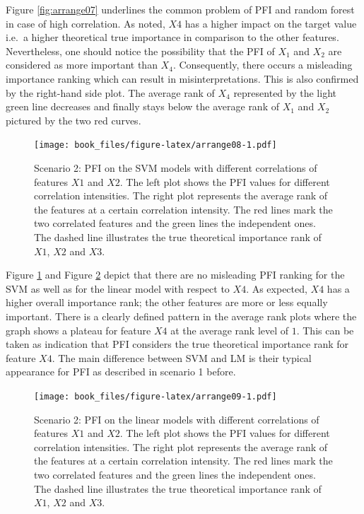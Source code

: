 \documentclass[
]{krantz}
\begin{document}
Figure \ref{fig:arrange07} underlines the common problem of PFI and random forest in case of high correlation. As noted, \(X4\) has a higher impact on the target value i.e.~a higher theoretical true importance in comparison to the other features. Nevertheless, one should notice the possibility that the PFI of \(X_1\) and \(X_2\) are considered as more important than \(X_4\). Consequently, there occurs a misleading importance ranking which can result in misinterpretations. This is also confirmed by the right-hand side plot. The average rank of \(X_4\) represented by the light green line decreases and finally stays below the average rank of \(X_1\) and \(X_2\) pictured by the two red curves.

\begin{figure}
\centering
\texttt{[image: book\_files/figure-latex/arrange08-1.pdf]}
\caption{\label{fig:arrange08}Scenario 2: PFI on the SVM models with different correlations of features \(X1\) and \(X2\). The left plot shows the PFI values for different correlation intensities. The right plot represents the average rank of the features at a certain correlation intensity. The red lines mark the two correlated features and the green lines the independent ones. The dashed line illustrates the true theoretical importance rank of \(X1\), \(X2\) and \(X3\).}
\end{figure}

Figure \ref{fig:arrange08} and Figure \ref{fig:arrange09} depict that there are no misleading PFI ranking for the SVM as well as for the linear model with respect to \(X4\). As expected, \(X4\) has a higher overall importance rank; the other features are more or less equally important. There is a clearly defined pattern in the average rank plots where the graph shows a plateau for feature \(X4\) at the average rank level of \(1\). This can be taken as indication that PFI considers the true theoretical importance rank for feature \(X4\). The main difference between SVM and LM is their typical appearance for PFI as described in scenario 1 before.

\begin{figure}
\centering
\texttt{[image: book\_files/figure-latex/arrange09-1.pdf]}
\caption{\label{fig:arrange09}Scenario 2: PFI on the linear models with different correlations of features \(X1\) and \(X2\). The left plot shows the PFI values for different correlation intensities. The right plot represents the average rank of the features at a certain correlation intensity. The red lines mark the two correlated features and the green lines the independent ones. The dashed line illustrates the true theoretical importance rank of \(X1\), \(X2\) and \(X3\).}
\end{figure}
\end{document}
